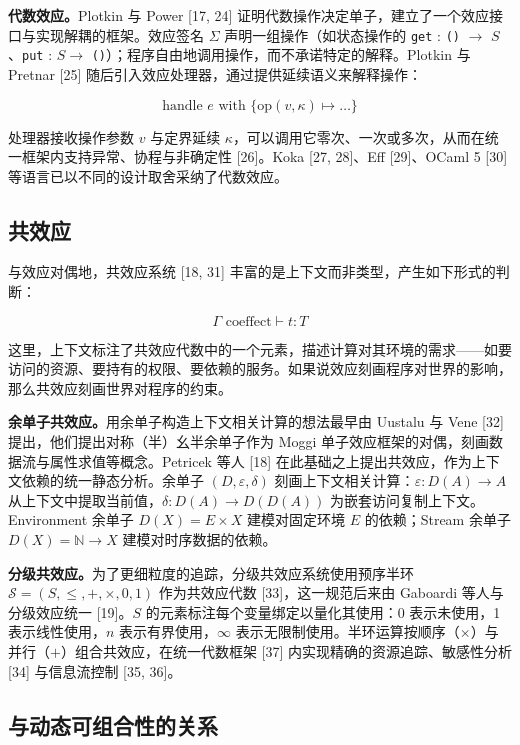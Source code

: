 \documentclass[11pt,a4paper]{article}
\theoremstyle{plain}
\theoremstyle{definition}
\theoremstyle{remark}
\begin{document}
\textbf{代数效应。}Plotkin 与 Power [17, 24] 证明代数操作决定单子，建立了一个效应接口与实现解耦的框架。效应签名 $\Sigma$ 声明一组操作（如状态操作的 \texttt{get} : \texttt{()} $\to$ $S$、\texttt{put} : $S \to$ \texttt{()}）；程序自由地调用操作，而不承诺特定的解释。Plotkin 与 Pretnar [25] 随后引入效应处理器，通过提供延续语义来解释操作：

\[
\text{handle } e \text{ with } \{ \text{op}(v, \kappa) \mapsto \dots \} \tag{2}
\]

处理器接收操作参数 $v$ 与定界延续 $\kappa$，可以调用它零次、一次或多次，从而在统一框架内支持异常、协程与非确定性 [26]。Koka [27, 28]、Eff [29]、OCaml 5 [30] 等语言已以不同的设计取舍采纳了代数效应。

\subsection{共效应}

与效应对偶地，共效应系统 [18, 31] 丰富的是上下文而非类型，产生如下形式的判断：

\[
\Gamma \text{ coeffect} \vdash t : T \tag{3}
\]

这里，上下文标注了共效应代数中的一个元素，描述计算对其环境的需求——如要访问的资源、要持有的权限、要依赖的服务。如果说效应刻画程序对世界的影响，那么共效应刻画世界对程序的约束。

\textbf{余单子共效应。}用余单子构造上下文相关计算的想法最早由 Uustalu 与 Vene [32] 提出，他们提出对称（半）幺半余单子作为 Moggi 单子效应框架的对偶，刻画数据流与属性求值等概念。Petricek 等人 [18] 在此基础之上提出共效应，作为上下文依赖的统一静态分析。余单子 $(D, \varepsilon, \delta)$ 刻画上下文相关计算：$\varepsilon : D(A) \to A$ 从上下文中提取当前值，$\delta : D(A) \to D(D(A))$ 为嵌套访问复制上下文。Environment 余单子 $D(X) = E \times X$ 建模对固定环境 $E$ 的依赖；Stream 余单子 $D(X) = \mathbb{N} \to X$ 建模对时序数据的依赖。

\textbf{分级共效应。}为了更细粒度的追踪，分级共效应系统使用预序半环 $\mathcal{S} = (S, \le, +, \times, 0, 1)$ 作为共效应代数 [33]，这一规范后来由 Gaboardi 等人与分级效应统一 [19]。$S$ 的元素标注每个变量绑定以量化其使用：0 表示未使用，1 表示线性使用，$n$ 表示有界使用，$\infty$ 表示无限制使用。半环运算按顺序（$\times$）与并行（$+$）组合共效应，在统一代数框架 [37] 内实现精确的资源追踪、敏感性分析 [34] 与信息流控制 [35, 36]。

\subsection{与动态可组合性的关系}
\end{document}
